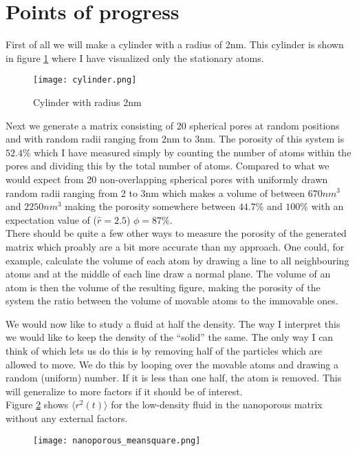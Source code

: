 \documentclass[a4paper,english, 10pt, twoside]{article}
\begin{document}
\section{Points of progress}
First of all we will make a cylinder with a radius of 2nm. This cylinder is shown in figure \ref{cylinder} 
where I have visualized only the stationary atoms.
\begin{figure}[H]
 \centering
 \texttt{[image: cylinder.png]}
 \caption{Cylinder with radius 2nm}
 \label{cylinder}
 \end{figure}
Next we generate a matrix consisting of 20 spherical pores at random positions and with random radii 
ranging from 2nm to 3nm. The porosity of this system is $52.4\%$ which I have measured simply by counting 
the number of atoms within the pores and dividing this by the total number of atoms. Compared to what we 
would expect from 20 non-overlapping spherical pores with uniformly drawn random radii ranging from 2 to 
3nm which makes a volume of between $670nm^3$ and $2250nm^3$ making the porosity somewhere between 
$44.7\%$ and $100\%$ with an expectation value of ($\hat{r} = 2.5$) $\phi = 87\%$.\\
There should be quite a few other ways to measure the porosity of the generated matrix which proably are 
a bit more accurate than my approach. One could, for example, calculate the volume of each atom by drawing 
a line to all neighbouring atoms and at the middle of each line draw a normal plane. The volume of an atom 
is then the volume of the resulting figure, making the porosity of the system the ratio between the volume 
of movable atoms to the immovable ones.

We would now like to study a fluid at half the density. The way I interpret this we would like to keep the 
density of the  ``solid'' the same. The only way I can think of which lets us do this is by removing half 
of the particles which are allowed to move. We do this by looping over the movable atoms and drawing a 
random (uniform) number. If it is less than one half, the atom is removed. This will generalize to more 
factors if it should be of interest.\\
Figure \ref{meansquare} shows $\langle r^2(t)\rangle$ for the low-density fluid in the nanoporous matrix 
without any external factors.
\begin{figure}[H]
 \centering
 \texttt{[image: nanoporous\_meansquare.png]}
 \label{meansquare}
\end{figure}
\end{document}
